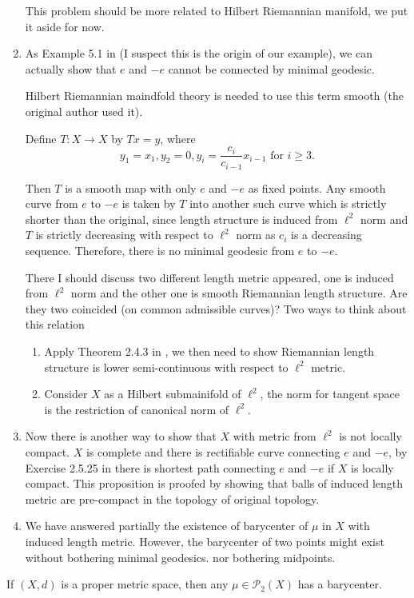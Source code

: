 \begin{rmk}
\begin{enumerate}
		      This problem should be more related to Hilbert Riemannian manifold, we put it aside for now.
		\item As Example 5.1 in \cite{grossman1965hilbert} (I suspect this is the origin of our example), we can actually show that $e$ and $-e$ cannot be connected by minimal geodesic.

		      Hilbert Riemannian maindfold  theory is needed to use this term smooth (the original author used it).

		      Define \( T: X \rightarrow X \) by \( T x = y \), where
		      \[
			      y _ { 1 } = x _ { 1 } , y _ { 2 } = 0 , y _ { i } = \frac{c_i}{c_{i-1}} x_{i-1} \text { for } i \geq 3 . \]

		      Then \( T \) is a smooth map with only \( e \) and \(- e \) as fixed points. Any smooth curve from \( e\) to \( -e \) is taken by \( T \) into another such curve which is strictly shorter than the original, since length structure is induced from $\ell^2$ norm and $T$ is strictly decreasing with respect to $\ell^2$ norm as $c_i$ is a decreasing sequence. Therefore, there is no minimal geodesic from \( e \) to \( -e . \)

		      There I should discuss two different length metric appeared, one is induced from $\ell^2$ norm and the other one is smooth Riemannian length structure. Are they two coincided (on common admissible curves)? Two ways to think about this relation
		      \begin{enumerate}
			      \item Apply Theorem 2.4.3 in \cite{burago2001course}, we then need to show Riemannian length structure is lower semi-continuous with respect to $\ell^2$ metric.
			      \item Consider $X$ as a Hilbert submainifold of $\ell^2$, the norm for tangent space is the restriction of canonical norm of $\ell^2$.
		      \end{enumerate}

		\item Now there is another way to show that $X$ with metric from $\ell^2$ is not locally compact. $X$ is complete and there is rectifiable curve connecting $e$ and $-e$, by Exercise 2.5.25 in \cite{burago2001course} there is shortest path connecting $e$ and $-e$ if $X$ is locally compact. This proposition is proofed by showing that balls of induced length metric are pre-compact in the topology of original topology.

		\item We have answered partially the existence of barycenter of $\mu$ in $X$ with induced length metric. However, the barycenter of two points might exist without bothering minimal geodesics. nor bothering midpoints.


	\end{enumerate}
\end{rmk}
\begin{lem}[Lemma 3.2]
	If \( ( X , d ) \) is a proper metric space, then any \( \mu \in \mathcal { P } _ { 2 } ( X ) \) has a barycenter.
\end{lem}


